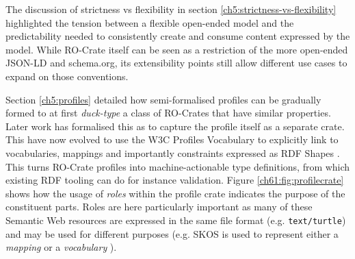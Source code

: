 The discussion of strictness vs flexibility in section \vref{ch5:strictness-vs-flexibility} highlighted the tension between a flexible open-ended model and the predictability needed to consistently create and consume content expressed by the model.
While RO-Crate itself can be seen as a restriction of the more open-ended JSON-LD and schema.org, its extensibility points still allow different use cases to expand on those conventions.  

Section \vref{ch5:profiles} detailed how semi-formalised profiles can be gradually formed to at first \emph{duck-type} a class of RO-Crates that have similar properties.
Later work has formalised this as  to capture the profile itself as a separate crate. This have now evolved to use the W3C Profiles Vocabulary \cite{Atkinson 2019} to explicitly link to vocabularies, mappings and importantly constraints expressed as RDF Shapes \cite{Soiland-Reyes 2023d}. 
This turns RO-Crate profiles into machine-actionable type definitions, from which existing RDF tooling can do for instance validation. 
Figure \ref{ch61:fig:profilecrate} shows how the usage of \emph{roles} within the profile crate indicates the purpose of the constituent parts.
Roles are here particularly important as many of these Semantic Web resources are expressed in the same file format (e.g. \texttt{text/turtle}) and may be used for different purposes (e.g.
SKOS is used to represent either a \emph{mapping} or a \emph{vocabulary} \cite{Isaac 2009}).

